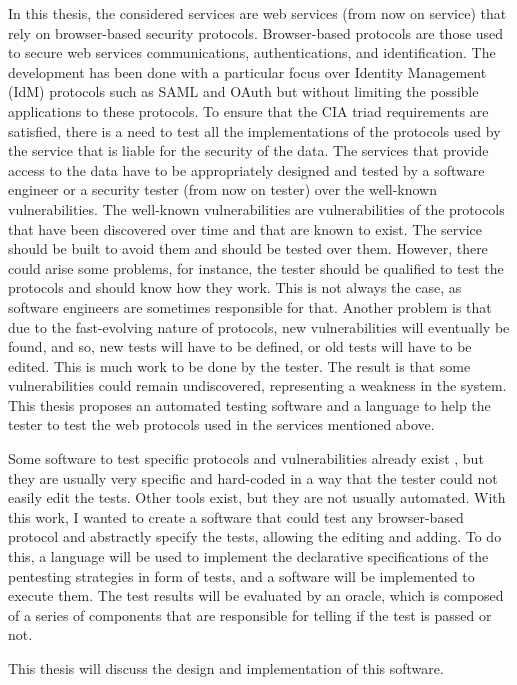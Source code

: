 In this thesis, the considered services are web services (from now on service) that rely on browser-based security protocols. Browser-based protocols are those used to secure web services communications, authentications, and identification. The development has been done with a particular focus over Identity Management (IdM) protocols such as \gls{SAML} and \gls{OAuth} but without limiting the possible applications to these protocols.
To ensure that the CIA triad requirements are satisfied, there is a need to test all the implementations of the protocols used by the service that is liable for the security of the data. The services that provide access to the data have to be appropriately designed and tested by a software engineer or a security tester (from now on tester) over the well-known vulnerabilities. The well-known vulnerabilities are vulnerabilities of the protocols that have been discovered over time and that are known to exist. The service should be built to avoid them and should be tested over them. However, there could arise some problems, for instance, the tester should be qualified to test the protocols and should know how they work. This is not always the case, as software engineers are sometimes responsible for that. Another problem is that due to the fast-evolving nature of protocols, new vulnerabilities will eventually be found, and so, new tests will have to be defined, or old tests will have to be edited. This is much work to be done by the tester. The result is that some vulnerabilities could remain undiscovered, representing a weakness in the system. This thesis proposes an automated testing software and a language to help the tester to test the web protocols used in the services mentioned above. 

Some software to test specific protocols and vulnerabilities already exist \cite{wendy_barreto,claudio_grisenti}, but they are usually very specific and hard-coded in a way that the tester could not easily edit the tests. Other tools exist, but they are not usually automated. With this work, I wanted to create a software that could test any browser-based protocol and abstractly specify the tests, allowing the editing and adding. To do this, a language will be used to implement the declarative specifications of the pentesting strategies in form of tests, and a software will be implemented to execute them. The test results will be evaluated by an oracle, which is composed of a series of components that are responsible for telling if the test is passed or not.

This thesis will discuss the design and implementation of this software.

